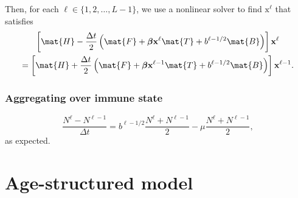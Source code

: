 \documentclass{jpmarticle}
\renewcommand{\vec}[1]{\boldsymbol{\mathrm{#1}}}
\begin{document}
Then, for each $\ell \in \{1, 2, \ldots, L - 1\}$,
we use a nonlinear solver to find $\vec{x}^{\ell}$ that satisfies
\begin{multline}
  \left[
    \mat{H}
    - \frac{\Delta t}{2}
    \left(
      \mat{F}
      + \vec{\beta} \vec{x}^{\ell} \mat{T}
      + b^{\ell - 1 / 2} \mat{B}
    \right)
  \right]
  \vec{x}^{\ell}
  \\
  =
  \left[
    \mat{H}
    + \frac{\Delta t}{2}
    \left(
      \mat{F}
      + \vec{\beta} \vec{x}^{\ell - 1} \mat{T}
      + b^{\ell - 1 / 2} \mat{B}
    \right)
  \right]
  \vec{x}^{\ell - 1}.
\end{multline}


\subsubsection{Aggregating over immune state}

\begin{equation}
  \frac{N^{\ell} - N^{\ell - 1}}{\Delta t}
  = b^{\ell - 1 / 2} \frac{N^{\ell} + N^{\ell - 1}}{2}
  - \mu \frac{N^{\ell} + N^{\ell - 1}}{2},
\end{equation}
as expected.


\section{Age-structured model}
\end{document}
